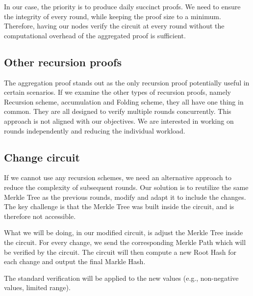 In our case, the priority is to produce daily succinct proofs. We need to ensure the integrity of every round, while keeping the proof size to a minimum.
Therefore, having our nodes verify the circuit at every round without the computational overhead of the aggregated proof is sufficient.

\subsection{Other recursion proofs}
The aggregation proof stands out as the only recursion proof potentially useful in certain scenarios.
If we examine the other types of recursion proofs, namely Recursion scheme, accumulation and Folding scheme, they all have one thing in common.
They are all designed to verify multiple rounds concurrently.
This approach is not aligned with our objectives. We are interested in working on rounds independently and reducing the individual workload.

\subsection{Change circuit}
If we cannot use any recursion schemes, we need an alternative approach to reduce the complexity of subsequent rounds.
Our solution is to reutilize the same Merkle Tree as the previous rounds, modify  and adapt it to include the changes.
The key challenge is that the Merkle Tree was built inside the circuit, and is therefore not accessible.

What we will be doing, in our modified circuit, is adjust the Merkle Tree inside the circuit.
For every change, we send the corresponding Merkle Path which will be verified by the circuit.
The circuit will then compute a new Root Hash for each change and output the final Markle Hash.

The standard verification will be applied to the new values (e.g., non-negative values, limited range).

